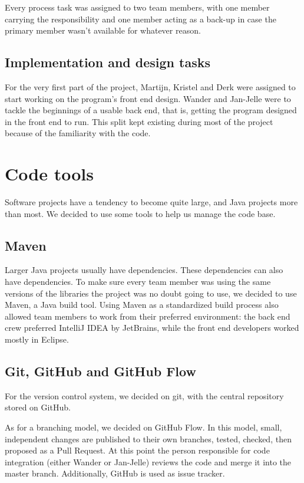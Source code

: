 Every process task was assigned to two team members, with one member carrying the responsibility and one member acting as a back-up in case the primary member wasn't available for whatever reason.

\subsection{Implementation and design tasks}

For the very first part of the project, Martijn, Kristel and Derk were assigned to start working on the program's front end design. Wander and Jan-Jelle were to tackle the beginnings of a usable back end, that is, getting the program designed in the front end to run. This split kept existing during most of the project because of the familiarity with the code.

\section{Code tools}

Software projects have a tendency to become quite large, and Java projects more than most. We decided to use some tools to help us manage the code base.

\subsection{Maven}

Larger Java projects usually have dependencies. These dependencies can also have dependencies. To make sure every team member was using the same versions of the libraries the project was no doubt going to use, we decided to use Maven, a Java build tool. Using Maven as a standardized build process also allowed team members to work from their preferred environment: the back end crew preferred IntelliJ IDEA by JetBrains, while the front end developers worked mostly in Eclipse. 

\subsection{Git, GitHub and GitHub Flow}

For the version control system, we decided on git, with the central repository stored on GitHub.  

As for a branching model, we decided on GitHub Flow\cite{githubflow}. In this model, small, independent changes are published to their own branches, tested, checked, then proposed as a Pull Request. At this point the person responsible for code integration (either Wander or Jan-Jelle) reviews the code and merge it into the master branch.  Additionally, GitHub is used as issue tracker.


